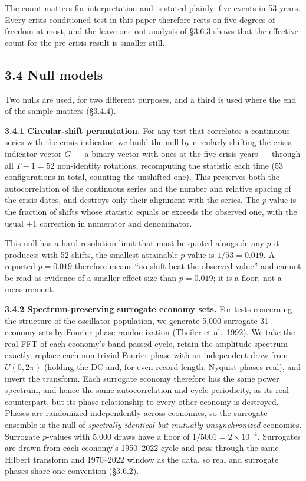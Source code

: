 \documentclass[11pt,a4paper]{article}
\begin{document}
The count matters for interpretation and is stated plainly: five events in 53 years. Every crisis-conditioned test in this paper therefore rests on five degrees of freedom at most, and the leave-one-out analysis of §3.6.3 shows that the effective count for the pre-crisis result is smaller still.

\subsection{3.4 Null models}\label{null-models}

Two nulls are used, for two different purposes, and a third is used where the end of the sample matters (§3.4.4).

\textbf{3.4.1 Circular-shift permutation.} For any test that correlates a continuous series with the crisis indicator, we build the null by circularly shifting the crisis indicator vector \(G\) — a binary vector with ones at the five crisis years — through all \(T-1 = 52\) non-identity rotations, recomputing the statistic each time (53 configurations in total, counting the unshifted one). This preserves both the autocorrelation of the continuous series and the number and relative spacing of the crisis dates, and destroys only their alignment with the series. The \(p\)-value is the fraction of shifts whose statistic equals or exceeds the observed one, with the usual \(+1\) correction in numerator and denominator.

This null has a hard resolution limit that must be quoted alongside any \(p\) it produces: with 52 shifts, the smallest attainable \(p\)-value is \(1/53 = 0.019\). A reported \(p = 0.019\) therefore means ``no shift beat the observed value'' and cannot be read as evidence of a smaller effect size than \(p = 0.019\); it is a floor, not a measurement.

\textbf{3.4.2 Spectrum-preserving surrogate economy sets.} For tests concerning the structure of the oscillator population, we generate 5,000 surrogate 31-economy sets by Fourier phase randomization (Theiler et al.~1992). We take the real FFT of each economy's band-passed cycle, retain the amplitude spectrum exactly, replace each non-trivial Fourier phase with an independent draw from \(U(0, 2\pi)\) (holding the DC and, for even record length, Nyquist phases real), and invert the transform. Each surrogate economy therefore has the same power spectrum, and hence the same autocorrelation and cycle periodicity, as its real counterpart, but its phase relationship to every other economy is destroyed. Phases are randomized independently across economies, so the surrogate ensemble is the null of \emph{spectrally identical but mutually unsynchronized} economies. Surrogate \(p\)-values with 5,000 draws have a floor of \(1/5001 = 2\times10^{-4}\). Surrogates are drawn from each economy's 1950–2022 cycle and pass through the same Hilbert transform and 1970–2022 window as the data, so real and surrogate phases share one convention (§3.6.2).
\end{document}

